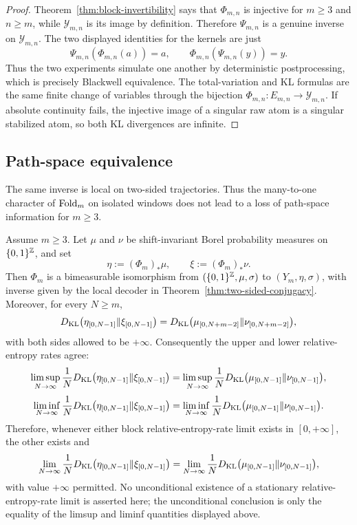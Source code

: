 \begin{proof}
Theorem~\ref{thm:block-invertibility} says that $\Phi_{m,n}$ is injective for
$m\ge3$ and $n\ge m$, while $\mathcal Y_{m,n}$ is its image by definition.
Therefore $\Psi_{m,n}$ is a genuine inverse on $\mathcal Y_{m,n}$.  The two
displayed identities for the kernels are just
\[
\Psi_{m,n}(\Phi_{m,n}(a))=a,\qquad
\Phi_{m,n}(\Psi_{m,n}(y))=y.
\]
Thus the two experiments simulate one another by deterministic postprocessing,
which is precisely Blackwell equivalence. The total-variation and KL formulas
are the same finite change of variables through the bijection
$\Phi_{m,n}:E_{m,n}\to\mathcal Y_{m,n}$. If absolute continuity fails, the
injective image of a singular raw atom is a singular stabilized atom, so both
KL divergences are infinite.
\end{proof}

\subsection{Path-space equivalence}

The same inverse is local on two-sided trajectories. Thus the many-to-one
character of $\mathrm{Fold}_m$ on isolated windows does not lead to a loss of
path-space information for $m\ge3$.

\begin{corollary}\label{cor:path-space-divergence}
Assume $m\ge3$.  Let $\mu$ and $\nu$ be shift-invariant Borel probability
measures on $\{0,1\}^{\mathbb{Z}}$, and set
\[
\eta:=(\Phi_m)_*\mu,\qquad \xi:=(\Phi_m)_*\nu .
\]
Then $\Phi_m$ is a bimeasurable isomorphism from
$(\{0,1\}^{\mathbb{Z}},\mu,\sigma)$ to $(Y_m,\eta,\sigma)$, with inverse given by the
local decoder in Theorem~\ref{thm:two-sided-conjugacy}.  Moreover, for every
$N\ge m$,
\[
D_{\mathrm{KL}}\bigl(\eta_{[0,N-1]}\|\xi_{[0,N-1]}\bigr)
=
D_{\mathrm{KL}}\bigl(\mu_{[0,N+m-2]}\|\nu_{[0,N+m-2]}\bigr),
\]
with both sides allowed to be $+\infty$. Consequently the upper and lower
relative-entropy rates agree:
\[
\limsup_{N\to\infty}\frac1N
D_{\mathrm{KL}}\bigl(\eta_{[0,N-1]}\|\xi_{[0,N-1]}\bigr)
=
\limsup_{N\to\infty}\frac1N
D_{\mathrm{KL}}\bigl(\mu_{[0,N-1]}\|\nu_{[0,N-1]}\bigr),
\]
\[
\liminf_{N\to\infty}\frac1N
D_{\mathrm{KL}}\bigl(\eta_{[0,N-1]}\|\xi_{[0,N-1]}\bigr)
=
\liminf_{N\to\infty}\frac1N
D_{\mathrm{KL}}\bigl(\mu_{[0,N-1]}\|\nu_{[0,N-1]}\bigr).
\]
Therefore, whenever either block relative-entropy-rate limit exists in
$[0,+\infty]$, the other exists and
\[
\lim_{N\to\infty}\frac1N
D_{\mathrm{KL}}\bigl(\eta_{[0,N-1]}\|\xi_{[0,N-1]}\bigr)
=
\lim_{N\to\infty}\frac1N
D_{\mathrm{KL}}\bigl(\mu_{[0,N-1]}\|\nu_{[0,N-1]}\bigr),
\]
with value $+\infty$ permitted.
No unconditional existence of a stationary relative-entropy-rate limit is
asserted here; the unconditional conclusion is only the equality of the
limsup and liminf quantities displayed above.
\end{corollary}

